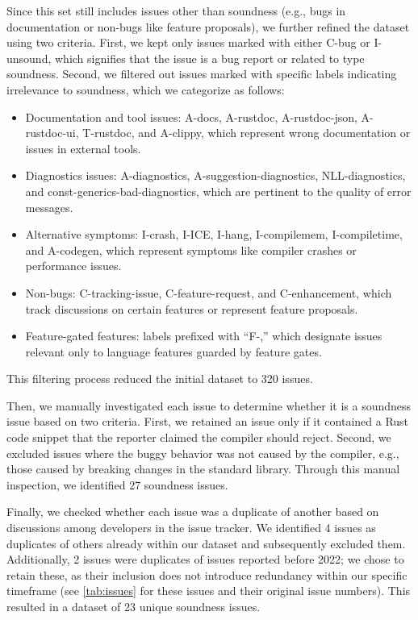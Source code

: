 Since this set still includes issues other than soundness (e.g., bugs in
documentation or non-bugs like feature proposals), we further refined the
dataset using two criteria.
%
First, we kept only issues marked with either C-bug or I-unsound, which
signifies that the issue is a bug report or related to type soundness.
%
Second, we filtered out issues marked with specific labels indicating
irrelevance to soundness, which we categorize as follows:
%
\begin{itemize}[leftmargin=*]
  \item Documentation and tool issues: A-docs, A-rustdoc, A-rustdoc-json,
    A-rustdoc-ui, T-rustdoc, and A-clippy, which represent wrong documentation
    or issues in external tools.
  \item Diagnostics issues: A-diagnostics, A-suggestion-diagnostics,
    NLL-diagnostics, and const-generics-bad-diagnostics, which are pertinent to
    the quality of error messages.
  \item Alternative symptoms: I-crash, I-ICE, I-hang, I-compilemem,
    I-compiletime, and A-codegen, which represent symptoms like compiler crashes
    or performance issues.
  \item Non-bugs: C-tracking-issue, C-feature-request, and C-enhancement, which
    track discussions on certain features or represent feature proposals.
  \item Feature-gated features: labels prefixed with ``F-,'' which designate
    issues relevant only to language features guarded by feature gates.
\end{itemize}
%
This filtering process reduced the initial dataset to 320 issues.

Then, we manually investigated each issue to determine whether it is a soundness
issue based on two criteria.
%
First, we retained an issue only if it contained a Rust code snippet that the
reporter claimed the compiler should reject.
%
Second, we excluded issues where the buggy behavior was not caused by the
compiler, e.g., those caused by breaking changes in the standard library.
%
Through this manual inspection, we identified 27 soundness issues.

Finally, we checked whether each issue was a duplicate of another based on
discussions among \rustc{} developers in the issue tracker.
%
We identified 4 issues as duplicates of others already within our dataset and
subsequently excluded them.
%
Additionally, 2 issues were duplicates of issues reported before 2022;
%
we chose to retain these, as their inclusion does not introduce redundancy
within our specific timeframe (see \cref{tab:issues} for these issues and their
original issue numbers).
%
This resulted in a dataset of 23 unique soundness issues.

